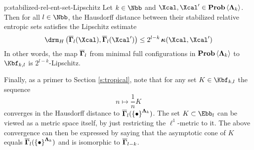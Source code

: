   \begin{theorem}{p:stabilized-rel-ent-set-Lipschitz}
    Let $k \in \Nbb$ and $\Xcal, \Xcal' \in \prob\<\Lambdabf_k>$.
    Then for all $l \in \Nbb$, the Hausdorff distance between their
    stabilized relative entropic sets satisfies the Lipschitz estimate
    \[
    \d_H\big( \sres_l(\Xcal), \sres_l(\Xcal') \big) 
    \leq 
    2^{l-k} \aikd(\Xcal, \Xcal')
    \]
    In other words, the map $\overline{\bm\Gamma}_l$ from minimal full
    configurations in $\prob\<\Lambdabf_k>$ to $\convconend$ is
    $2^{l-k}$-Lipschitz.
\end{theorem}

  Finally, as a primer to Section \ref{s:tropical}, note that for any
  set $K \in \convconend$ the sequence
  \[
  n \mapsto \frac{1}{n} K
  \]
  converges in the Hausdorff distance to
  $\overline{\bm\Gamma}_l(\left\{\bullet\right\}^{\bm\Lambda_{k}})$. The set $K\subset
  \Ebb_{l}$ can be viewed as a metric space itself, by just restricting
  the $\ell^1$-metric to it. The above convergence can then be
  expressed by saying that the asymptotic cone of $K$ equals
  $\overline{\bm\Gamma}_l(\left\{\bullet\right\}^{\bm\Lambda_{k}})$ and is isomorphic to $\overline{\bm\Gamma}_{l-k}$.

